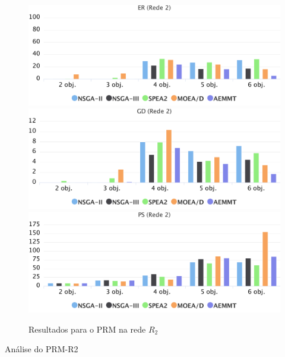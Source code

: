 \begin{figure}[!htbp]
	\caption{Resultados para o PRM na rede $R_2$}
	\label{fig_exp1_mrp_r2}
	\includegraphics[width=1\textwidth]{cap_experimentos/figs/er-mrp-r2}
	\includegraphics[width=1\textwidth]{cap_experimentos/figs/gd-mrp-r2}
	\includegraphics[width=1\textwidth]{cap_experimentos/figs/ps-mrp-r2}
\end{figure}

Análise do PRM-R2

